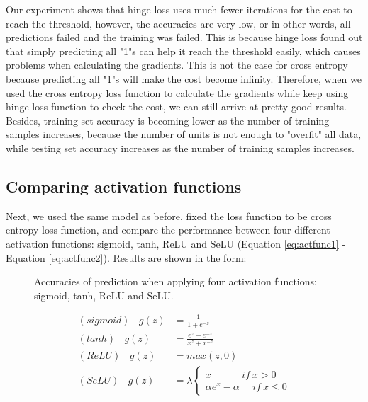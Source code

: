 \documentclass[UTF8,12pt]{article}
\begin{document}
	Our experiment shows that hinge loss uses much fewer iterations for the cost to reach the threshold, however, the accuracies are very low, or in other words, all predictions failed and the training was failed. This is because hinge loss found out that simply predicting all "1"s can help it reach the threshold easily, which causes problems when calculating the gradients. This is not the case for cross entropy because predicting all "1"s will make the cost become infinity. Therefore, when we used the cross entropy loss function to calculate the gradients while keep using hinge loss function to check the cost, we can still arrive at pretty good results. Besides, training set accuracy is becoming lower as the number of training samples increases, because the number of units is not enough to "overfit" all data, while testing set accuracy increases as the number of training samples increases.
	\subsection{Comparing activation functions}
	Next, we used the same model as before, fixed the loss function to be cross entropy loss function, and compare the performance between four different activation functions: sigmoid, tanh, ReLU and SeLU (Equation \ref{eq:actfunc1} - Equation \ref{eq:actfunc2}). Results are shown in the form:
	\begin{figure}[!ht]
		\centering
		\caption{\label{fig:actfunc}Accuracies of prediction when applying four activation functions: sigmoid, tanh, ReLU and SeLU.}
	\end{figure}
	\begin{align}
	\label{eq:actfunc1}
	(sigmoid) \ \ \ \ g(z) &= \frac{1}{1+e^{-z}}\\
	(tanh) \ \ \ \ g(z) &= \frac{e^{z}-e^{-z}}{x^{z}+x^{-z}}\\
	(ReLU) \ \ \ \ g(z) &= max(z,0)\\
	\label{eq:actfunc2}
	(SeLU) \ \ \ \ g(z) &= \lambda\left\{\begin{matrix}
	x \ \ \ \ \ \ \ \ \ \ \ \ \ \ if \ x> 0\\
	\alpha e^{x}-\alpha \ \ \ \ \ \ if \ x\leq 0
	\end{matrix}\right.
	\end{align}
	
\end{document}
